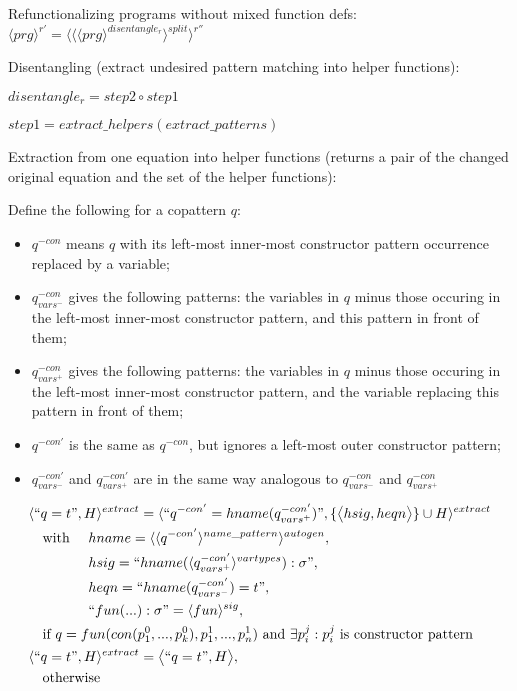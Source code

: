 \documentclass[11pt]{article} %
\begin{document}
Refunctionalizing programs without mixed function defs: $\langle prg \rangle^{r'} = \langle \langle \langle prg \rangle^{disentangle_r} \rangle^{split} \rangle^{r''}$

Disentangling (extract undesired pattern matching into helper functions):

$disentangle_r = step2 \circ step1$

$step1 = extract\_helpers(extract\_patterns)$

Extraction from one equation into helper functions (returns a pair of the changed original equation and the set of the helper functions):

Define the following for a copattern $q$:

\begin{itemize}
\item $q^{-con}$ means $q$ with its left-most inner-most constructor pattern occurrence replaced by a variable;
\item $q^{-con}_{vars^-}$ gives the following patterns: the variables in $q$ minus those occuring in the left-most inner-most constructor pattern, and this pattern in front of them;
\item $q^{-con}_{vars^+}$ gives the following patterns: the variables in $q$ minus those occuring in the left-most inner-most constructor pattern, and the variable replacing this pattern in front of them;
\item $q^{-con'}$ is the same as $q^{-con}$, but ignores a left-most outer constructor pattern;
\item $q^{-con'}_{vars^-}$ and $q^{-con'}_{vars^+}$ are in the same way analogous to $q^{-con}_{vars^-}$ and $q^{-con}_{vars^+}$
\end{itemize}

\begin{alignat*}{3}
&\langle `` q = t ", H \rangle^{extract} = \langle `` q^{-con'} = hname (q^{-con'}_{vars^+}) ", \{\big\langle hsig, heqn \big\rangle\} \cup H \rangle^{extract} \span\span \\
&\quad \textrm{with } && hname = \langle \langle q^{-con'} \rangle^{name\_pattern} \rangle^{autogen}, \\
&\quad && hsig = `` hname(\langle q^{-con'}_{vars^+} \rangle^{vartypes}): \sigma ", \\
&\quad && heqn = `` hname(q^{-con'}_{vars^-}) = t ", \\
&\quad && `` fun(...): \sigma " = \langle fun \rangle^{sig}, \\
&\quad \textrm{if } q = fun(con(p_1^0, ..., p_k^0), p^1_1, ..., p^1_n) \textrm{ and } \exists p_i^j: p_i^j \textrm{ is constructor pattern} \span\span \\
&\langle `` q = t ", H \rangle^{extract} = \big\langle `` q = t ", H \big\rangle, \span\span \\
&\quad \textrm{otherwise} \span\span
\end{alignat*}
\end{document}
